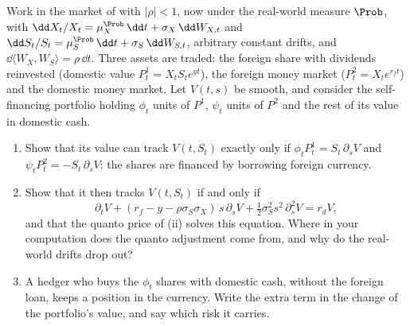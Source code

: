 \begin{exercise}\label{ex:ma-quanto-hedge}
\hard Work in the market of  with $|\rho|<1$, now under the real-world measure $\Prob$, with
$\dd X_t/X_t=\mu^{\Prob}_X\,\dd t+\sigma_X\,\dd W_{X,t}$ and $\dd S_t/S_t=\mu^{\Prob}_S\,\dd t+\sigma_S\,\dd W_{S,t}$, arbitrary
constant drifts, and $\dd\langle W_X,W_S\rangle=\rho\,\dd t$. Three assets are traded: the foreign share with
dividends reinvested (domestic value $P^1_t=X_tS_te^{yt}$), the foreign money market ($P^2_t=X_te^{r_ft}$)
and the domestic money market. Let $V(t,s)$ be smooth, and consider the self-financing portfolio holding
$\phi_t$ units of $P^1$, $\psi_t$ units of $P^2$ and the rest of its value in domestic cash.
\begin{enumerate}[label=(\alph*)]
  \item Show that its value can track $V(t,S_t)$ exactly only if $\phi_tP^1_t=S_t\,\partial_sV$ and
    $\psi_tP^2_t=-S_t\,\partial_sV$: the shares are financed by borrowing foreign currency.
  \item Show that it then tracks $V(t,S_t)$ if and only if
    \[
      \partial_tV+(r_f-y-\rho\sigma_S\sigma_X)\,s\,\partial_sV+\tfrac12\sigma_S^2s^2\,\partial_s^2V=r_dV,
    \]
    and that the quanto price of (ii) solves this equation. Where in your
    computation does the quanto adjustment come from, and why do the real-world drifts drop out?
  \item A hedger who buys the $\phi_t$ shares with domestic cash, without the foreign loan, keeps a
    position in the currency. Write the extra term in the change of the portfolio's value, and say
    which risk it carries.
\end{enumerate}
\end{exercise}

